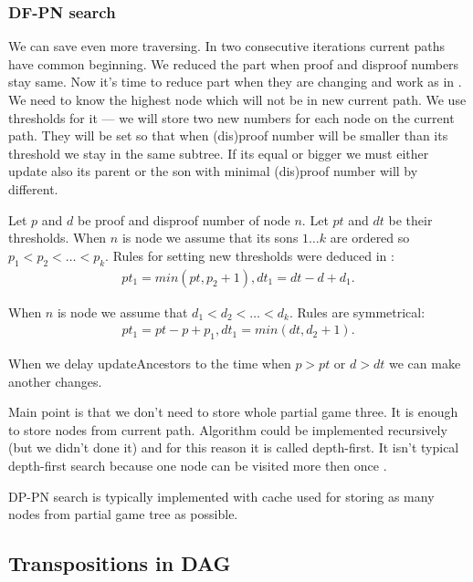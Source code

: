 \subsubsection{DF-PN search} \label{dfpn}

We can save even more traversing. In two consecutive iterations current paths
have common beginning.  We reduced the part when proof and disproof
numbers stay same. Now it's time to reduce part when they are changing and work
as in . We need to know the highest node which will not be in new
current path. We use thresholds for it --- we will store two new numbers for
each node on the current path. They will be set so that when (dis)proof number
will be smaller than its threshold we stay in the same subtree. If its equal or
bigger we must either update also its parent or the son with minimal (dis)proof
number will by different. 

Let $p$ and $d$ be proof and disproof number of node $n$. Let $pt$ and $dt$ be
their thresholds. When $n$ is  node we assume that its sons $1\ldots k$
are ordered so $p_1 < p_2 < \ldots < p_k$. Rules for setting new thresholds
were deduced in : 
\begin{eqnarray*} 
	pt_1 = min(pt, p_2+1), dt_1 = dt - d + d_1.
\end{eqnarray*}

When $n$ is  node we assume that $d_1 < d_2 < \ldots < d_k$. Rules
are symmetrical:  
\begin{eqnarray*} 
	pt_1 = pt-p+p_1, dt_1 = min(dt,d_2+1).
\end{eqnarray*}

When we delay updateAncestors to the time when $p > pt$ or $d > dt$ we can make
another changes. 

Main point is that we don't need to store whole partial game three. It is
enough to store nodes from current path. Algorithm could be implemented
recursively (but we didn't done it) and for this reason it is called depth-first.
It isn't typical depth-first search because one node can be visited more
then once . 

DP-PN search is typically implemented with cache used for storing as many
nodes from partial game tree as possible. 

\subsection{Transpositions in DAG} \label{DAG}
 
